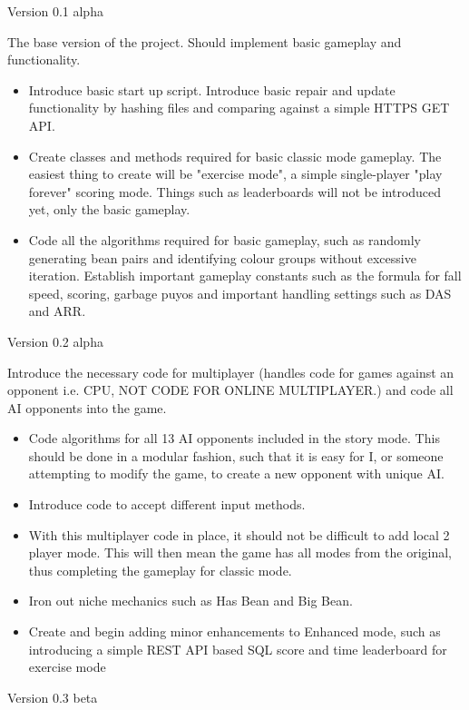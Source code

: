 \documentclass{article}
\begin{document}
Version 0.1 alpha

The base version of the project. Should implement basic gameplay and functionality.
\begin{itemize}
    \renewcommand\labelitemi{--}
    \item Introduce basic start up script. Introduce basic repair and update functionality by hashing files and comparing against a simple HTTPS GET API.
    \item Create classes and methods required for basic classic mode gameplay. The easiest thing to create will be "exercise mode", a simple single-player "play forever" scoring mode. Things such as leaderboards will not be introduced yet, only the basic gameplay.
    \item Code all the algorithms required for basic gameplay, such as randomly generating bean pairs and identifying colour groups without excessive iteration. Establish important gameplay constants such as the formula for fall speed, scoring, garbage puyos and important handling settings such as DAS and ARR.
\end{itemize}

Version 0.2 alpha

Introduce the necessary code for multiplayer (handles code for games against an opponent i.e. CPU, NOT CODE FOR ONLINE MULTIPLAYER.) and code all AI opponents into the game.
\begin{itemize}
    \renewcommand\labelitemi{--}
    \item Code algorithms for all 13 AI opponents included in the story mode. This should be done in a modular fashion, such that it is easy for I, or someone attempting to modify the game, to create a new opponent with unique AI.
    \item Introduce code to accept different input methods.
    \item With this multiplayer code in place, it should not be difficult to add local 2 player mode. This will then mean the game has all modes from the original, thus completing the gameplay for classic mode.
    \item Iron out niche mechanics such as Has Bean and Big Bean.
    \item Create and begin adding minor enhancements to Enhanced mode, such as introducing a simple REST API based SQL score and time leaderboard for exercise mode
\end{itemize}

Version 0.3 beta
\end{document}
